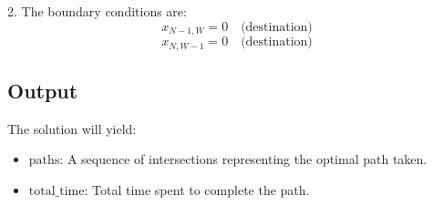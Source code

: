 \documentclass{article}
\begin{document}
2. The boundary conditions are:
   \[
   x_{N-1, W} = 0 \quad \text{(destination)}
   \]
   \[
   x_{N, W-1} = 0 \quad \text{(destination)}
   \]

\subsection*{Output}

The solution will yield:
\begin{itemize}
    \item \( \text{paths} \): A sequence of intersections representing the optimal path taken.
    \item \( \text{total\_time} \): Total time spent to complete the path.
\end{itemize}
\end{document}
